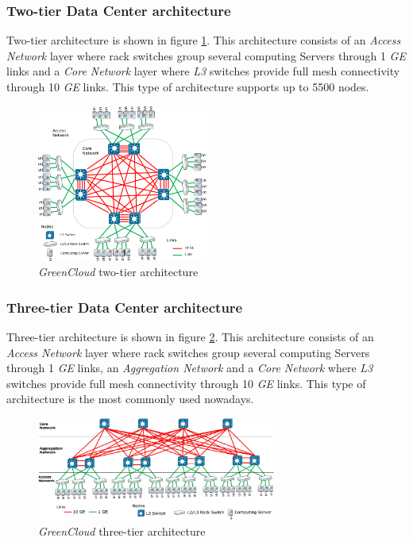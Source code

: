 \subsubsection{Two-tier Data Center architecture}
Two-tier architecture is shown in figure \ref{fig:greencloud_twotier}. This architecture consists of an \emph{Access Network} layer where rack switches group several computing Servers through 1 \emph{GE} links and a \emph{Core Network} layer where \emph{L3} switches provide full mesh connectivity through 10 \emph{GE} links. This type of architecture supports up to 5500 nodes.
\begin{figure}[h]
    \centering
    \includegraphics[width=0.5\textwidth]{chapters/images/greencloud_twotier.png}
    \caption{\emph{GreenCloud} two-tier architecture}
    \label{fig:greencloud_twotier}
\end{figure}

\subsubsection{Three-tier Data Center architecture}
Three-tier architecture is shown in figure \ref{fig:greencloud_threetier}. This architecture consists of an \emph{Access Network} layer where rack switches group several computing Servers through 1 \emph{GE} links, an \emph{Aggregation Network} and a \emph{Core Network} where \emph{L3} switches provide full mesh connectivity through 10 \emph{GE} links. This type of architecture is the most commonly used nowadays.

\begin{figure}[h]
    \centering
    \includegraphics[width=0.7\textwidth]{chapters/images/greencloud_threetier.png}
    \caption{\emph{GreenCloud} three-tier architecture}
    \label{fig:greencloud_threetier}
\end{figure}


